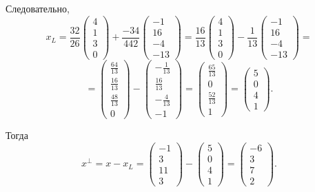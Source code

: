 Следовательно,
\[
x_L=
\frac{32}{26}
\begin{pmatrix}
4\\
1\\
3\\
0
\end{pmatrix}
+
\frac{-34}{442}
\begin{pmatrix}
-1\\
16\\
-4\\
-13
\end{pmatrix}
=
\frac{16}{13}
\begin{pmatrix}
4\\
1\\
3\\
0
\end{pmatrix}
-
\frac{1}{13}
\begin{pmatrix}
-1\\
16\\
-4\\
-13
\end{pmatrix}
=\]
\[=
\begin{pmatrix}
\frac{64}{13}\\
\frac{16}{13}\\
\frac{48}{13}\\
0
\end{pmatrix}
-
\begin{pmatrix}
-\frac{1}{13}\\
\frac{16}{13}\\
-\frac{4}{13}\\
-1
\end{pmatrix}
=
\begin{pmatrix}
\frac{65}{13}\\
0\\
\frac{52}{13}\\
1
\end{pmatrix}
=
\begin{pmatrix}
5\\
0\\
4\\
1
\end{pmatrix}.
\]

Тогда
\[
x^\perp=x-x_L=
\begin{pmatrix}
-1\\
3\\
11\\
3
\end{pmatrix}
-
\begin{pmatrix}
5\\
0\\
4\\
1
\end{pmatrix}
=
\begin{pmatrix}
-6\\
3\\
7\\
2
\end{pmatrix}.
\]

